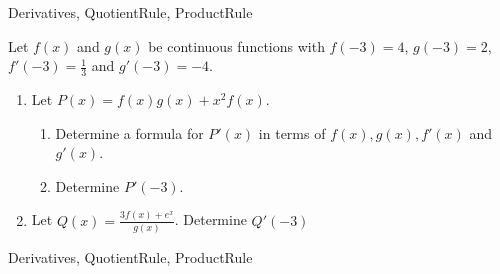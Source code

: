 
\begin{tagblock}{Derivatives, QuotientRule, ProductRule}
\begin{question}
	



Let $f(x)$ and $g(x)$ be continuous functions with $f(-3) = 4$, $g(-3)=2$, $f'(-3) = \frac{1}{3}$ and $g'(-3) =-4$. 
\begin{enumerate}
\item  Let $P(x) = f(x)g(x) + x^2f(x)$.  
\begin{enumerate} 
\item  Determine a formula for $P'(x)$ in terms of $f(x), g(x), f'(x)$ and $g'(x)$.

\vspace{2in}

\item Determine $P'(-3)$.

\end{enumerate} 

\vspace{1.5in}

\item  Let $\displaystyle Q(x) = \frac{3f(x) + e^x}{g(x)}$.  Determine $Q'(-3)$


\end{enumerate} 














	










	
	
\begin{tags}
	    Derivatives, QuotientRule, ProductRule
\end{tags}
	
\begin{diary}
\end{diary}
	
\begin{solution}
	   
\end{solution}
	
\end{question}

\end{tagblock}

